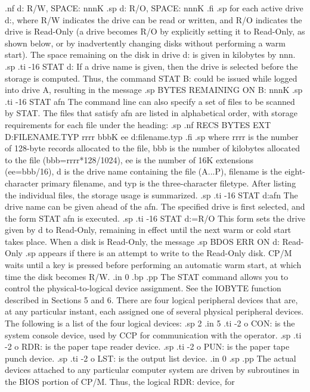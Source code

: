 .nf
d: R/W, SPACE:  nnnK
.sp
d: R/O, SPACE:  nnnK
.fi
.sp
for each active drive d:, where R/W indicates the drive can be read or 
written, and R/O indicates the drive is Read-Only (a drive becomes R/O by 
explicitly setting it to Read-Only, as shown below, or by inadvertently 
changing disks without performing a warm start).  The space remaining on 
the disk in drive d: is given in kilobytes by nnn.
.sp
.ti -16
STAT d:         If a drive name is given, then the drive is selected before 
the storage is computed.  Thus, the command STAT B: could be issued while 
logged into drive A, resulting in the message
.sp
BYTES REMAINING ON B:  nnnK
.sp
.ti -16
STAT afn        The command line can also specify a set of files to be 
scanned by STAT.  The files that satisfy afn are listed in alphabetical 
order, with storage requirements for each file under the heading:
.sp
.nf
RECS BYTES EXT D:FILENAME.TYP
rrrr bbbK ee d:filename.typ
.fi
.sp
where rrrr is the number of 128-byte records allocated to the file, bbb is 
the number of kilobytes allocated to the file (bbb=rrrr*128/1024), ee is the 
number of 16K extensions (ee=bbb/16), d is the drive name containing the 
file (A...P), filename is the eight-character primary filename, and 
typ is the three-character filetype.  After listing the individual 
files, the storage usage is summarized.
.sp
.ti -16
STAT d:afn      The drive name can be given ahead of the afn.  The specified 
drive is first selected, and the form STAT afn is executed.
.sp
.ti -16
STAT d:=R/O     This form sets the drive given by d to Read-Only, remaining 
in effect until the next warm or cold start takes place.  When a disk is 
Read-Only, the message
.sp
BDOS ERR ON d:  Read-Only
.sp
appears if there is an attempt to write to the Read-Only disk.  CP/M 
waits until a key is pressed before performing an automatic 
warm start, at 
which time the disk becomes R/W.
.in 0
.bp
.pp
The STAT command allows you to control the physical-to-logical device 
assignment.  See the IOBYTE function described in Sections 5 and 6.  There 
are four logical peripheral devices that are, at any particular instant, each 
assigned one of several physical peripheral devices.  The 
following is a list of the four logical devices:
.sp 2
.in 5
.ti -2
o CON: is the system console device, used by CCP for communication with the 
operator.
.sp
.ti -2
o RDR: is the paper tape reader device.
.sp
.ti -2
o PUN: is the paper tape punch device.
.sp
.ti -2
o LST: is the output list device.
.in 0
.sp 
.pp
The actual devices attached to any particular computer system are driven by 
subroutines in the BIOS portion of CP/M.  Thus, the logical RDR: device, for 
